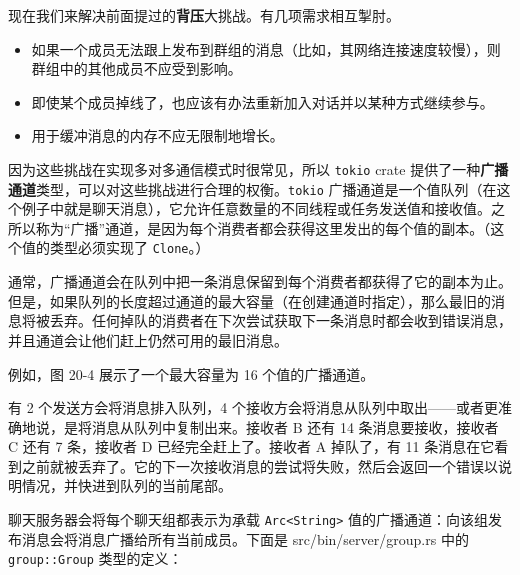 现在我们来解决前面提过的\textbf{背压}大挑战。有几项需求相互掣肘。

\begin{itemize}
\item 如果一个成员无法跟上发布到群组的消息（比如，其网络连接速度较慢），则群组中的其他成员不应受到影响。
\item 即使某个成员掉线了，也应该有办法重新加入对话并以某种方式继续参与。
\item 用于缓冲消息的内存不应无限制地增长。
\end{itemize}

因为这些挑战在实现多对多通信模式时很常见，所以 \texttt{tokio} crate 提供了一种\textbf{广播通道}类型，可以对这些挑战进行合理的权衡。\texttt{tokio} 广播通道是一个值队列（在这个例子中就是聊天消息），它允许任意数量的不同线程或任务发送值和接收值。之所以称为“广播”通道，是因为每个消费者都会获得这里发出的每个值的副本。（这个值的类型必须实现了 \texttt{Clone}。）

通常，广播通道会在队列中把一条消息保留到每个消费者都获得了它的副本为止。但是，如果队列的长度超过通道的最大容量（在创建通道时指定），那么最旧的消息将被丢弃。任何掉队的消费者在下次尝试获取下一条消息时都会收到错误消息，并且通道会让他们赶上仍然可用的最旧消息。

例如，图 20-4 展示了一个最大容量为 16 个值的广播通道。


有 2 个发送方会将消息排入队列，4 个接收方会将消息从队列中取出——或者更准确地说，是将消息从队列中复制出来。接收者 B 还有 14 条消息要接收，接收者 C 还有 7 条，接收者 D 已经完全赶上了。接收者 A 掉队了，有 11 条消息在它看到之前就被丢弃了。它的下一次接收消息的尝试将失败，然后会返回一个错误以说明情况，并快进到队列的当前尾部。

聊天服务器会将每个聊天组都表示为承载 \texttt{Arc<String>} 值的广播通道：向该组发布消息会将消息广播给所有当前成员。下面是 src/bin/server/\allowbreak{}group.rs 中的 \texttt{group::Group} 类型的定义：


